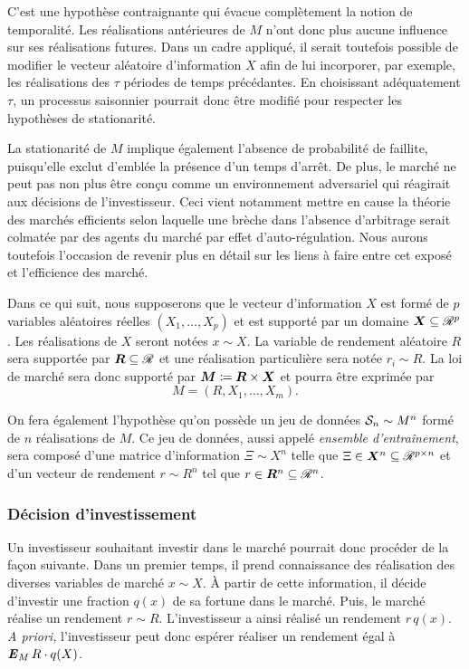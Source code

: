 C'est une hypothèse contraignante qui évacue complètement la notion de temporalité. Les
réalisations antérieures de $M$ n'ont donc plus aucune influence sur ses réalisations
futures. Dans un cadre appliqué, il serait toutefois possible de modifier le vecteur
aléatoire d'information $X$ afin de lui incorporer, par exemple, les réalisations des
$\tau$ périodes de temps précédantes. En choisissant adéquatement $\tau$, un processus
saisonnier pourrait donc être modifié pour respecter les hypothèses de stationarité.

La stationarité de $M$ implique également l'absence de probabilité de faillite,
puisqu'elle exclut d'emblée la présence d'un temps d'arrêt. De plus, le marché ne peut pas
non plus être conçu comme un environnement adversariel qui réagirait aux décisions de
l'investisseur. Ceci vient notamment mettre en cause la théorie des marchés efficients
selon laquelle une brèche dans l'absence d'arbitrage serait colmatée par des agents du
marché par effet d'auto-régulation. Nous aurons toutefois l'occasion de revenir plus en
détail sur les liens à faire entre cet exposé et l'efficience des marché.

Dans ce qui suit, nous supposerons que le vecteur d'information $X$ est formé de $p$
variables aléatoires réelles $(X_1,\ldots,X_p)$ et est supporté par un domaine
$\X \subseteq \Re^p$. Les réalisations de $X$ seront notées $x \sim X$. La variable de rendement
aléatoire $R$ sera supportée par $\R \subseteq \Re$ et une réalisation particulière sera notée
$r_i \sim R$.  La loi de marché sera donc supporté par $\M\coloneqq \R \times \X$ et pourra être
exprimée par
\begin{equation}
  M = (R,X_1, \ldots, X_m).
\end{equation}

On fera également l'hypothèse qu'on possède un jeu de données $\S_n \sim M^n$ formé de $n$
réalisations de $M$. Ce jeu de données, aussi appelé \textit{ensemble d'entraînement},
sera composé d'une matrice d'information $\Xi \sim X^n$ telle que
$\Xi \in \X^n \subseteq \Re^{p \times n}$ et d'un vecteur de rendement $r \sim R^n$ tel que $r \in \R^n \subseteq \Re^n$.


\subsubsection{Décision d'investissement}

Un investisseur souhaitant investir dans le marché pourrait donc procéder de la façon
suivante. Dans un premier temps, il prend connaissance des réalisation des diverses
variables de marché $x \sim X$. À partir de cette information, il décide d'investir une
fraction $q(x)$ de sa fortune dans le marché. Puis, le marché réalise un rendement
$r \sim R$. L'investisseur a ainsi réalisé un rendement $r\,q(x)$. \textit{A priori,}
l'investisseur peut donc espérer réaliser un rendement égal à $\E_MR\cdot q(X)$.


